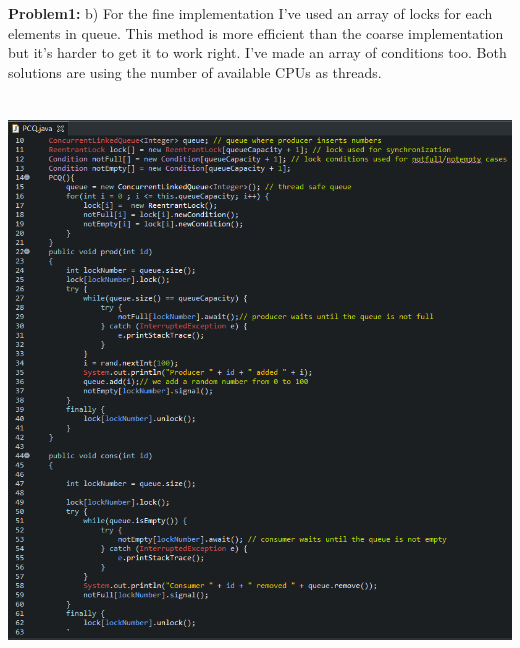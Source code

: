 \documentclass[14pt]{article}
\begin{document}
\textbf{Problem1:} b) For the fine implementation I've used an array of locks for each elements in queue. This method is more efficient than the coarse implementation but it's harder to get it to work right. I've made an array of conditions too. Both solutions are using the number of available CPUs as threads.\\
\includegraphics[height=6.2in, width = 5.5in]{fine.png}\\
\\\vspace{20 mm}\\
\end{document}
